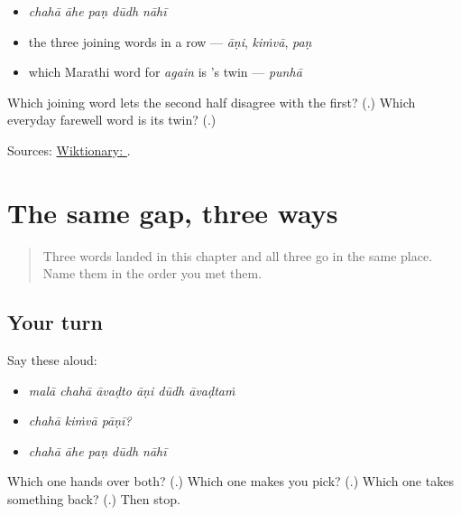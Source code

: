 \begin{itemize}
\raggedright
  \item \emph{chahā āhe paṇ dūdh nāhī}
  \item the three joining words in a row — \emph{āṇi}, \emph{kiṁvā}, \emph{paṇ}
  \item which Marathi word for \emph{again} is \textbf{}'s twin — \emph{punhā}
\end{itemize}

\begin{tcolorbox}[breakable,colback=teal!4,colframe=teal!35!black,title={Before you move on}]
Which joining word lets the second half disagree with the first? (\textbf{}.) Which everyday farewell word is its twin? (\textbf{}.)

Sources: \href{https://en.wiktionary.org/wiki/\%E0\%A4\%AA\%E0\%A4\%A3}{Wiktionary: }.
\end{tcolorbox}
\section[\texorpdfstring{… \mr{आणि} … · … \mr{किंवा} … (… āṇi … · … …)}{… आणि … · … किंवा … (… āṇi … · … …)}]{The same gap, three ways}

\label{lesson:MR-R30-three-joins}



\begin{quote}
Three words landed in this chapter and all three go in the same place. Name them in the order you met them.
\end{quote}

\subsection*{Your turn}
Say these aloud:

\begin{itemize}
\raggedright
  \item \emph{malā chahā āvaḍto āṇi dūdh āvaḍtaṁ}
  \item \emph{chahā kiṁvā pāṇī?}
  \item \emph{chahā āhe paṇ dūdh nāhī}
\end{itemize}

\begin{tcolorbox}[breakable,colback=teal!4,colframe=teal!35!black,title={Before you move on}]
Which one hands over both? (\textbf{}.) Which one makes you pick? (\textbf{}.) Which one takes something back? (\textbf{}.) Then stop.
\end{tcolorbox}

